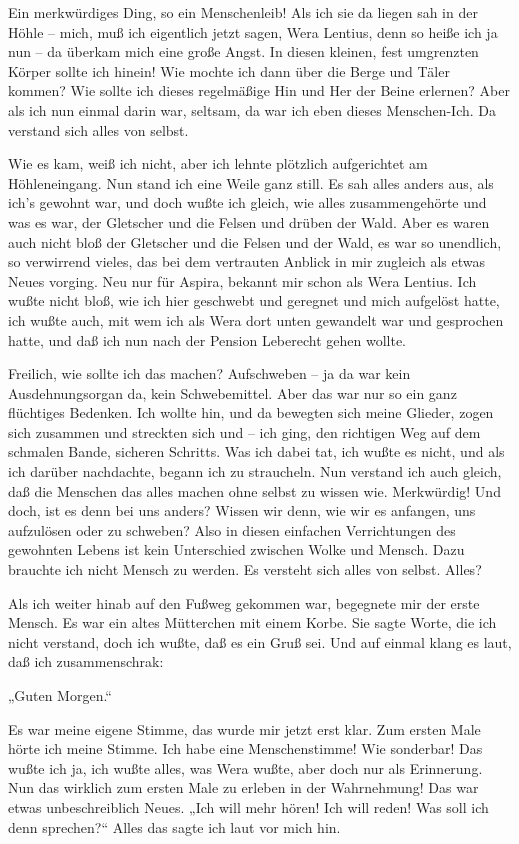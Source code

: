 Ein merkwürdiges Ding, so ein Menschenleib! Als ich sie da liegen
sah in der Höhle – mich, muß ich eigentlich jetzt sagen, Wera
Lentius, denn so heiße ich ja nun – da überkam mich eine große
Angst. In diesen kleinen, fest umgrenzten Körper sollte ich hinein!
Wie mochte ich dann über die Berge und Täler kommen? Wie sollte ich
dieses regelmäßige Hin und Her der Beine erlernen? Aber als ich nun
einmal darin war, seltsam, da war ich eben dieses Menschen-Ich. Da
verstand sich alles von selbst.

Wie es kam, weiß ich nicht, aber ich lehnte plötzlich aufgerichtet
am Höhleneingang. Nun stand ich eine Weile ganz still. Es sah alles
anders aus, als ich's gewohnt war, und doch wußte ich gleich, wie
alles zusammengehörte und was es war, der Gletscher und die Felsen
und drüben der Wald. Aber es waren auch nicht bloß der Gletscher
und die Felsen und der Wald, es war so unendlich, so verwirrend
vieles, das bei dem vertrauten Anblick in mir zugleich als etwas
Neues vorging. Neu nur für Aspira, bekannt mir schon als Wera
Lentius. Ich wußte nicht bloß, wie ich hier geschwebt und geregnet
und mich aufgelöst hatte, ich wußte auch, mit wem ich als Wera dort
unten gewandelt war und gesprochen hatte, und daß ich nun nach der
Pension Leberecht gehen wollte.

Freilich, wie sollte ich das machen? Aufschweben – ja da war kein
Ausdehnungsorgan da, kein Schwebemittel. Aber das war nur so ein
ganz flüchtiges Bedenken. Ich wollte hin, und da bewegten sich
meine Glieder, zogen sich zusammen und streckten sich und – ich
ging, den richtigen Weg auf dem schmalen Bande, sicheren Schritts.
Was ich dabei tat, ich wußte es nicht, und als ich darüber
nachdachte, begann ich zu straucheln. Nun verstand ich auch gleich,
daß die Menschen das alles machen ohne selbst zu wissen wie.
Merkwürdig! Und doch, ist es denn bei uns anders? Wissen wir denn,
wie wir es anfangen, uns aufzulösen oder zu schweben? Also in
diesen einfachen Verrichtungen des gewohnten Lebens ist kein
Unterschied zwischen Wolke und Mensch. Dazu brauchte ich nicht
Mensch zu werden. Es versteht sich alles von selbst. Alles?

Als ich weiter hinab auf den Fußweg gekommen war, begegnete mir der
erste Mensch. Es war ein altes Mütterchen mit einem Korbe. Sie
sagte Worte, die ich nicht verstand, doch ich wußte, daß es ein
Gruß sei. Und auf einmal klang es laut, daß ich zusammenschrak:

„Guten Morgen.“

Es war meine eigene Stimme, das wurde mir jetzt erst klar. Zum
ersten Male hörte ich meine Stimme. Ich habe eine Menschenstimme!
Wie sonderbar! Das wußte ich ja, ich wußte alles, was Wera wußte,
aber doch nur als Erinnerung. Nun das wirklich zum ersten Male zu
erleben in der Wahrnehmung! Das war etwas unbeschreiblich Neues.
„Ich will mehr hören! Ich will reden! Was soll ich denn sprechen?“
Alles das sagte ich laut vor mich hin.

